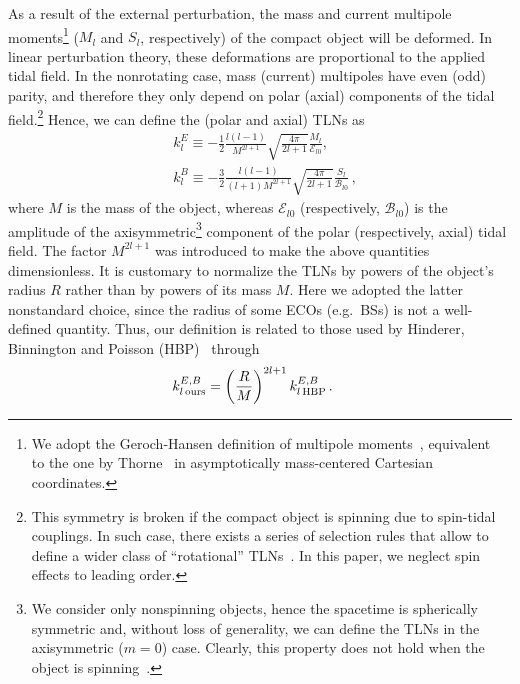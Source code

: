 \documentclass[aps,twocolumn,showpacs,preprintnumbers,nofootinbib,prd,superscriptaddress,groupedaddress,10pt]{revtex4-1}
\def\be{\begin{equation}}
\def\ee{\end{equation}}
\begin{document}
As a result of the external perturbation, the mass and current multipole moments\footnote{We adopt the Geroch-Hansen definition of multipole moments~\cite{Geroch:1970cd,Hansen:1974zz}, equivalent~\cite{Gursel:1983} to the one by Thorne~\cite{Thorne:1980ru} in asymptotically mass-centered Cartesian coordinates.} ($M_l$ and $S_l$, respectively) of the compact object will be deformed. In linear perturbation theory, these deformations are proportional to the applied tidal field. In the nonrotating case, mass (current) multipoles have even (odd) parity, and therefore they 
only depend on polar (axial) components of the tidal field.\footnote{This symmetry is broken if the compact object is spinning due to spin-tidal couplings. In such case, there exists a series of selection rules that allow to define a wider class of ``rotational'' TLNs~\cite{Pani:2015hfa,Landry:2015zfa,Pani:2015nua,Landry:2015snx}. In this paper, we neglect spin effects to leading order.} Hence, we can define the (polar and axial) TLNs as~\cite{Hinderer:2007mb,Binnington:2009bb}
%
\begin{equation}
\begin{split}
&k^E_{l}\equiv -\frac12 \frac{l(l-1)}{M^{2l+1}} \sqrt{\frac{4\pi}{2l+1}}\frac{M_l}{\mathcal{E}_{l0}},\\
& k^B_{l}\equiv -\frac32 \frac{l(l-1)}{(l+1)M^{2l+1}}\sqrt{\frac{4\pi}{2l+1}}  \frac{S_l}{\mathcal{B}_{l0}}\,, \label{Lovenumbersdef1}
\end{split}
\end{equation}
%
where $M$ is the mass of the object, whereas $\mathcal{E}_{l0}$ (respectively, $\mathcal{B}_{l0}$) is the amplitude of the axisymmetric\footnote{We consider only nonspinning objects, hence the spacetime is spherically symmetric and, without loss of generality, we can define the TLNs in the axisymmetric ($m=0$) case. Clearly, this property does not hold when the object is spinning~\cite{Poisson:2014gka,Landry:2015zfa,Pani:2015nua}.} component of the polar (respectively, axial) tidal field.
%
The factor $M^{2l+1}$ was introduced to make the above quantities dimensionless. It is customary to normalize the TLNs by powers of the object's radius $R$ rather than by powers of its mass $M$. Here we adopted the latter nonstandard choice, since the radius of some ECOs (e.g.\, BSs) is not a well-defined quantity. Thus, our definition is related to those used by Hinderer, Binnington and Poisson (HBP)~\cite{Hinderer:2007mb,Binnington:2009bb} through
%
\be
\begin{split}
&k^{E,B}_{l\, {\rm ours}}=\left(\frac{R}{M}\right)^{2l+1} k^{E,B}_{l\, {\rm HBP}}\,. \label{conversion}
\end{split}
\ee
\end{document}
